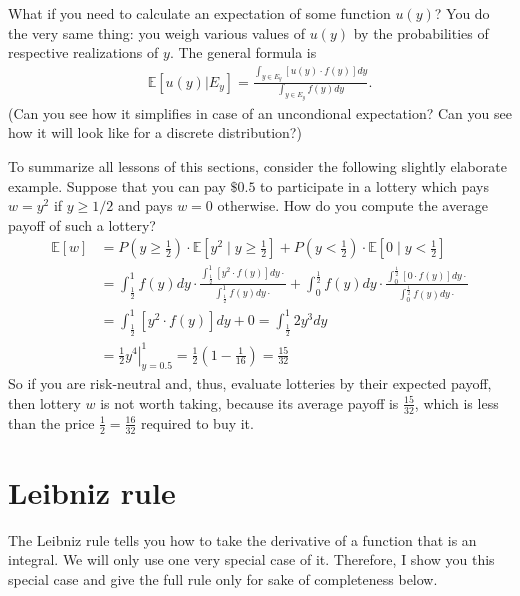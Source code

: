 \documentclass{article}
\begin{document}
What if you need to calculate an expectation of some function $u(y)$? You do the very same thing: you weigh various values of $u(y)$ by the probabilities of respective realizations of $y$. The general formula is
\begin{align*}
	\mathbb{E}[u(y)|E_y]
	= \frac{\int_{y \in E_y} \left[u(y) \cdot f(y)\right] dy}{\int_{y \in E_y} f(y) dy}.
\end{align*}
(Can you see how it simplifies in case of an uncondional expectation? Can you see how it will look like for a discrete distribution?)

To summarize all lessons of this sections, consider the following slightly elaborate example. Suppose that you can pay $\$0.5$ to participate in a lottery which pays $w=y^2$ if $y \geq 1/2$ and pays $w=0$ otherwise. How do you compute the average payoff of such a lottery?
\begin{align*}
	\mathbb{E}[w] &= P\left(y \geq \frac{1}{2}\right) \cdot \mathbb{E}\left[y^2 \mid y \geq \frac{1}{2}\right] + P\left(y < \frac{1}{2}\right) \cdot \mathbb{E}\left[0 \mid y < \frac{1}{2}\right]
	\\
	&= \int_{\frac{1}{2}}^1 f(y) dy \cdot \frac{\int_{\frac{1}{2}}^1 \left[y^2 \cdot f(y)\right] dy \cdot}{\int_{\frac{1}{2}}^1 f(y) dy \cdot} + \int_0^{\frac{1}{2}} f(y) dy \cdot \frac{\int_0^{\frac{1}{2}} \left[0 \cdot f(y)\right] dy \cdot}{\int_0^{\frac{1}{2}} f(y) dy \cdot}
	\\
	&= \int_{\frac{1}{2}}^1 \left[y^2 \cdot f(y)\right] dy + 0 = \int_{\frac{1}{2}}^1 2y^3 dy
	\\
	&= \left. \frac{1}{2}y^4 \right|_{y=0.5}^1 = \frac{1}{2} \left(1 - \frac{1}{16}\right) = \frac{15}{32}
\end{align*}
So if you are risk-neutral and, thus, evaluate lotteries by their expected payoff, then lottery $w$ is not worth taking, because its average payoff is $\frac{15}{32}$, which is less than the price $\frac{1}{2}=\frac{16}{32}$ required to buy it.




\section{Leibniz rule}

The Leibniz rule tells you how to take the derivative of a function that is an integral. We will only use one very special case of it. Therefore, I show you this special case and give the full rule only for sake of completeness below.
\end{document}

